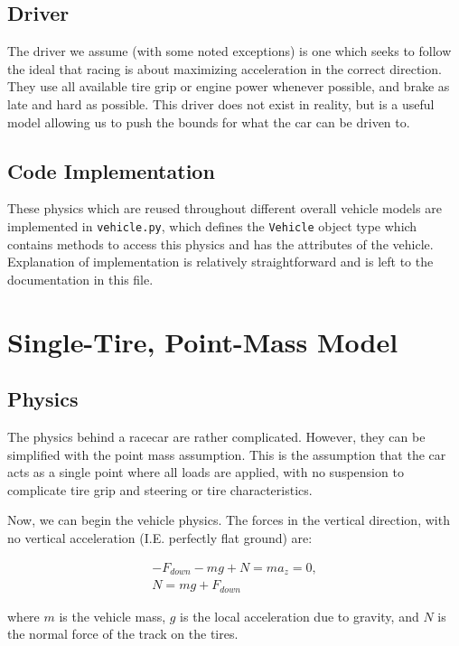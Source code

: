 \documentclass{article}
\begin{document}

\subsection{Driver}

The driver we assume (with some noted exceptions) is one which seeks to follow the ideal that racing is about maximizing acceleration in the correct direction. They use all available tire grip or engine power whenever possible, and brake as late and hard as possible. This driver does not exist in reality, but is a useful model allowing us to push the bounds for what the car can be driven to.

\subsection{Code Implementation}
These physics which are reused throughout different overall vehicle models are implemented in \texttt{vehicle.py}, which defines the \texttt{Vehicle} object type which contains methods to access this physics and has the attributes of the vehicle. Explanation of implementation is relatively straightforward and is left to the documentation in this file.

\section{Single-Tire, Point-Mass Model}

\subsection{Physics}

The physics behind a racecar are rather complicated. However, they can be simplified with the point mass assumption. This is the assumption that the car acts as a single point where all loads are applied, with no suspension to complicate tire grip and steering or tire characteristics.

Now, we can begin the vehicle physics. The forces in the vertical direction, with no vertical acceleration (I.E. perfectly flat ground) are:

\begin{align}
    -F_{down} -m g + N = m a_{z} = 0, \\
    N = m g + F_{down} \label{eq_z}
\end{align}

where $m$ is the vehicle mass, $g$ is the local acceleration due to gravity, and $N$ is the normal force of the track on the tires.
\end{document}

